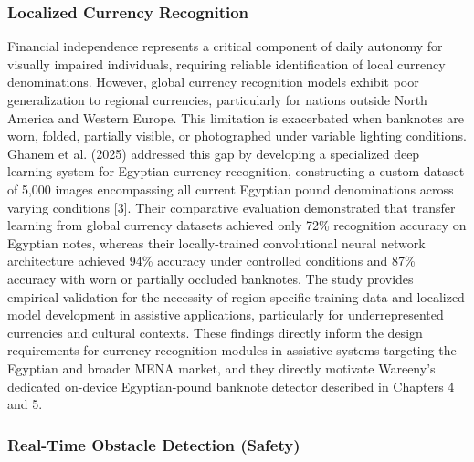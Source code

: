 \documentclass[a4paper]{report}
\begin{document}
\subsubsection{Localized Currency Recognition}

Financial independence represents a critical component of daily autonomy for visually impaired individuals, requiring reliable identification of local currency denominations. However, global currency recognition models exhibit poor generalization to regional currencies, particularly for nations outside North America and Western Europe. This limitation is exacerbated when banknotes are worn, folded, partially visible, or photographed under variable lighting conditions. Ghanem et al. (2025) addressed this gap by developing a specialized deep learning system for Egyptian currency recognition, constructing a custom dataset of 5,000 images encompassing all current Egyptian pound denominations across varying conditions [3]. Their comparative evaluation demonstrated that transfer learning from global currency datasets achieved only 72\% recognition accuracy on Egyptian notes, whereas their locally-trained convolutional neural network architecture achieved 94\% accuracy under controlled conditions and 87\% accuracy with worn or partially occluded banknotes. The study provides empirical validation for the necessity of region-specific training data and localized model development in assistive applications, particularly for underrepresented currencies and cultural contexts. These findings directly inform the design requirements for currency recognition modules in assistive systems targeting the Egyptian and broader MENA market, and they directly motivate Wareeny's dedicated on-device Egyptian-pound banknote detector described in Chapters 4 and 5.

\subsubsection{Real-Time Obstacle Detection (Safety)}
\end{document}
